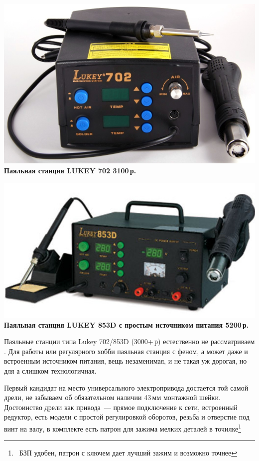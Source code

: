 \documentclass{magazine}
\begin{document}
{\noindent\href{http://voltmaster-samara.ru/catalog/product/00073444/}{
\includegraphics[width=\columnwidth]{fig/00/Lukey702.jpg}}
\textbf{Паяльная станция LUKEY 702 3100\,р.}

\noindent\href{http://shop.siriust.ru/product\_info.php/cPath/23\_28\_269/products\_id/15290}{
\includegraphics[width=\columnwidth]{fig/00/Lukey853D.jpg}}
\textbf{Паяльная станция LUKEY 853D с простым источником питания 5200\,р.}

Паяльные станции типа Lukey 702/853D (3000+\,р) естественно не рассматриваем
\smiley. Для работы или регулярного хобби паяльная станция с феном, а может даже
и встроенным источником питания, вещь незаменимая, и не такая уж дорогая, но для
\scr а слишком технологичная.

\bigskip

Первый кандидат на место универсального электропривода достается той
самой дрели, не забываем об обязательном наличии 43\,мм монтажной шейки.
Достоинство дрели как привода\ --- прямое подключение к сети, встроенный
редуктор, есть модели с простой регулировкой оборотов, резьба и отверстие под
винт на валу, в комплекте есть патрон для зажима мелких деталей в
точилке\footnote{\ БЗП удобен, патрон с ключем дает лучший зажим и возможно
точнее}

}
\end{document}
